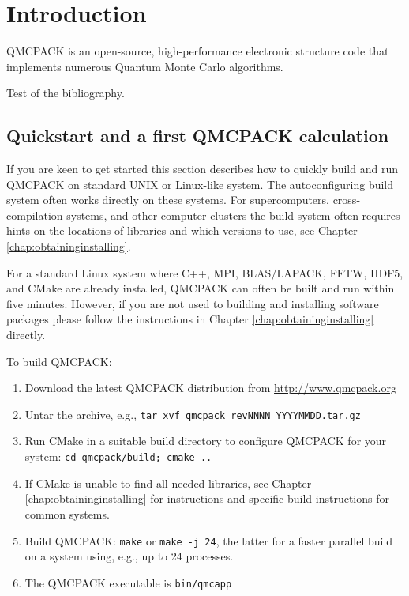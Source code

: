 \chapter{Introduction}
\label{chap:introduction}

QMCPACK is an open-source, high-performance electronic structure code that implements numerous Quantum Monte Carlo algorithms.

Test of the bibliography\cite{CeperleyAlderPRL1980}.

\section{Quickstart and a first QMCPACK calculation}
If you are keen to get started this section describes how to quickly
build and run QMCPACK on standard UNIX or Linux-like system. The
autoconfiguring build system often works directly on these
systems. For supercomputers, cross-compilation systems, and other computer
clusters the build system often requires hints on the locations of
libraries and which versions to use,  see Chapter
\ref{chap:obtaininginstalling}.

For a standard
Linux system where C++, MPI, BLAS/LAPACK, FFTW, HDF5, and CMake are already installed,
QMCPACK can often be built and run within five minutes. However, if
you are not used to building and installing software packages please
follow the instructions in Chapter \ref{chap:obtaininginstalling} directly.

To build QMCPACK:

\begin{enumerate}
\item Download the latest QMCPACK distribution from
  \url{http://www.qmcpack.org}
\item Untar the archive, e.g., \texttt{tar xvf
    qmcpack\_revNNNN\_YYYYMMDD.tar.gz}
\item Run CMake in a suitable build directory to configure QMCPACK for
  your system: \texttt{cd
    qmcpack/build; cmake ..}
\item If CMake is unable to find all needed libraries, see Chapter
  \ref{chap:obtaininginstalling} for instructions and specific build
  instructions for common systems.
\item Build QMCPACK: \texttt{make} or \texttt{make -j 24}, the latter
  for a faster parallel build on a system using, e.g., up to 24 processes.
\item The QMCPACK executable is \texttt{bin/qmcapp}
\end{enumerate}

